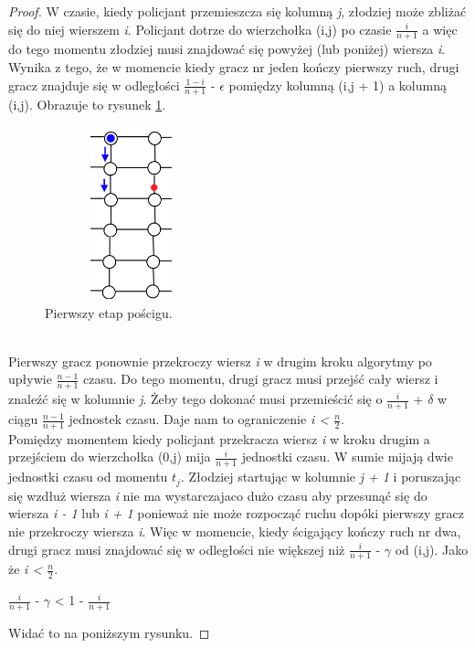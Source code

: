 \documentclass[brudnopis]{xmgr}
\begin{document}
\begin{proof}
	\indent W czasie, kiedy policjant przemieszcza się kolumną \textit{j}, złodziej może zbliżać się do niej wierszem \textit{i}. Policjant dotrze do wierzchołka (i,j) po czasie $\frac{i}{n+1}$ a więc do tego momentu złodziej musi znajdować się powyżej (lub poniżej) wiersza \textit{i}. Wynika z tego, że w momencie kiedy gracz nr jeden kończy pierwszy ruch, drugi gracz znajduje się w odległości $\frac{1-i}{n+1}$ - $\epsilon$ pomiędzy kolumną (i,j + 1) a kolumną (i,j). Obrazuje to rysunek \ref{fig:pierwszy krok}.
	\begin{figure}[ht!]
	  \centering
	  \includegraphics[width=5cm,height=5cm]{rysunki/poscig_1.png}
	  \caption{Pierwszy etap pościgu.}
	  \label{fig:pierwszy krok}
	\end{figure}
	\\\indent Pierwszy gracz ponownie przekroczy wiersz \textit{i} w drugim kroku algorytmy po upływie $\frac{n-1}{n+1}$ czasu. Do tego momentu, drugi gracz musi przejść cały wiersz i znaleźć się w kolumnie \textit{j}. Żeby tego dokonać musi przemieścić się o $\frac{i}{n+1}$ + $\delta$ w ciągu $\frac{n-1}{n+1}$ jednostek czasu. Daje nam to ograniczenie \textit{i < $\frac{n}{2}$}.
	\\\indent Pomiędzy momentem kiedy policjant przekracza wiersz \textit{i} w kroku drugim a przejściem do wierzchołka (0,j) mija $\frac{i}{n+1}$ jednostki czasu. W sumie mijają dwie jednostki czasu od momentu $t_j$. Złodziej startując w kolumnie \textit{j + 1} i poruszając się wzdłuż wiersza \textit{i} nie ma wystarczajaco dużo czasu aby przesunąć się do wiersza \textit{i - 1} lub \textit{i + 1} ponieważ nie może rozpocząć ruchu dopóki pierwszy gracz nie przekroczy wiersza \textit{i}. Więc w momencie, kiedy ścigający kończy ruch nr dwa, drugi gracz musi znajdować się w odległości nie większej niż $\frac{i}{n+1}$ - $\gamma$ od (i,j). Jako że \textit{i < $\frac{n}{2}$}.
	\begin{center}
	$\frac{i}{n+1}$ - $\gamma$ < 1 - $\frac{i}{n+1}$
	\end{center}
	Widać to na poniższym rysunku.

\end{proof}
\end{document}
